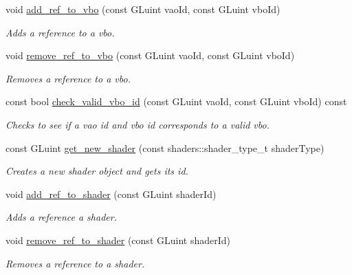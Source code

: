 \begin{DoxyCompactItemize}
\item 
void \hyperlink{classoccluded_1_1opengl_1_1retained_1_1gl__retained__object__manager_a041f82cec0f30fa9e5309051841b39a9}{add\+\_\+ref\+\_\+to\+\_\+vbo} (const G\+Luint vao\+Id, const G\+Luint vbo\+Id)
\begin{DoxyCompactList}\small\item\em Adds a reference to a vbo. \end{DoxyCompactList}\item 
void \hyperlink{classoccluded_1_1opengl_1_1retained_1_1gl__retained__object__manager_af7208b2920a70e49e0a762025f2c540e}{remove\+\_\+ref\+\_\+to\+\_\+vbo} (const G\+Luint vao\+Id, const G\+Luint vbo\+Id)
\begin{DoxyCompactList}\small\item\em Removes a reference to a vbo. \end{DoxyCompactList}\item 
const bool \hyperlink{classoccluded_1_1opengl_1_1retained_1_1gl__retained__object__manager_aab50f60978195fc332cbb3b9eebe7cd0}{check\+\_\+valid\+\_\+vbo\+\_\+id} (const G\+Luint vao\+Id, const G\+Luint vbo\+Id) const 
\begin{DoxyCompactList}\small\item\em Checks to see if a vao id and vbo id corresponds to a valid vbo. \end{DoxyCompactList}\item 
const G\+Luint \hyperlink{classoccluded_1_1opengl_1_1retained_1_1gl__retained__object__manager_a6a8a6dd2e50e1cc08122adc5afec3cfa}{get\+\_\+new\+\_\+shader} (const shaders\+::shader\+\_\+type\+\_\+t shader\+Type)
\begin{DoxyCompactList}\small\item\em Creates a new shader object and gets its id. \end{DoxyCompactList}\item 
void \hyperlink{classoccluded_1_1opengl_1_1retained_1_1gl__retained__object__manager_afd26e51ac4d582c879c88862991514dc}{add\+\_\+ref\+\_\+to\+\_\+shader} (const G\+Luint shader\+Id)
\begin{DoxyCompactList}\small\item\em Adds a reference a shader. \end{DoxyCompactList}\item 
void \hyperlink{classoccluded_1_1opengl_1_1retained_1_1gl__retained__object__manager_a84804949b75971093ee3aab5dcd66a00}{remove\+\_\+ref\+\_\+to\+\_\+shader} (const G\+Luint shader\+Id)
\begin{DoxyCompactList}\small\item\em Removes a reference to a shader. \end{DoxyCompactList}\item 

\end{DoxyCompactItemize}

